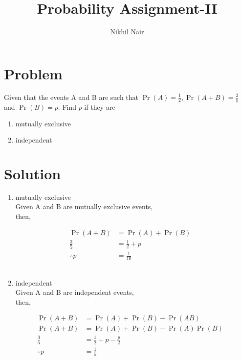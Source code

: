 \documentclass[journal,12pt,twocolumn]{IEEEtran}
\title{\mytitle}
\title{
Probability Assignment-II
}
\author{Nikhil Nair}
\begin{document}
\maketitle
\bigskip



\section{\textbf{Problem }}
Given that the events A and B are such that $\Pr{(A)}=\frac{1}{2}, \Pr{(A + B)}=\frac{3}{5}$ and $\Pr{(B)}=p$. Find $p$ if they are \\
\begin{enumerate}
    \item mutually exclusive
    \item independent
\end{enumerate}


\section{\textbf{Solution }}
\begin{enumerate}
\item mutually exclusive
\\
Given A and B are mutually exclusive events,\\
then,

\begin{align}
\Pr{(A + B)} &=\Pr{(A)} + \Pr{(B)}&
\\
\frac{3}{5}&=\frac{1}{2}+p&
\\
\therefore  p &= \frac{1}{10}&
\end{align}
\\

\item independent
\\
Given A and B are independent events,\\
then,

\begin{align}
\Pr{(A + B)} &=\Pr{(A)} + \Pr{(B)} - \Pr{(A B)}& 
\\
\Pr{(A + B)} &=\Pr{(A)} + \Pr{(B)} - \Pr{(A)}\Pr{(B)}&
\\
\frac{3}{5}&=\frac{1}{2}+ p - \frac{p}{2}&
\\
\therefore p &= \frac{1}{5}&
\end{align}

\end{enumerate}
\end{document}
